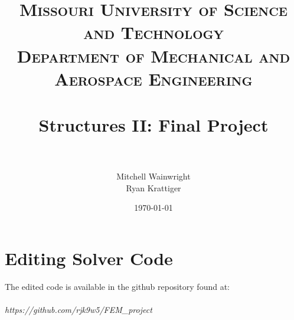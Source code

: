 \documentclass[paper=letter, fontsize=11pt]{scrartcl} %
\title{	
\normalfont \normalsize 
\textsc{Missouri University of Science and Technology \\ Department of Mechanical and Aerospace Engineering} \\ [25pt] %
\horrule{0.5pt} \\[0.4cm] %
\huge Structures II: Final Project \\ %
\horrule{2pt} \\[0.5cm] %
}
\author{Mitchell Wainwright \\ Ryan Krattiger} %
\date{\normalsize\today} %
\numberwithin{equation}{section} %
\numberwithin{figure}{section} %
\numberwithin{table}{section} %
\begin{document}
\maketitle %


\section{Editing Solver Code}

The edited code is available in the github repository found at: \\\\
\textit{https://github.com/rjk9w5/FEM\_project} 
\end{document}
